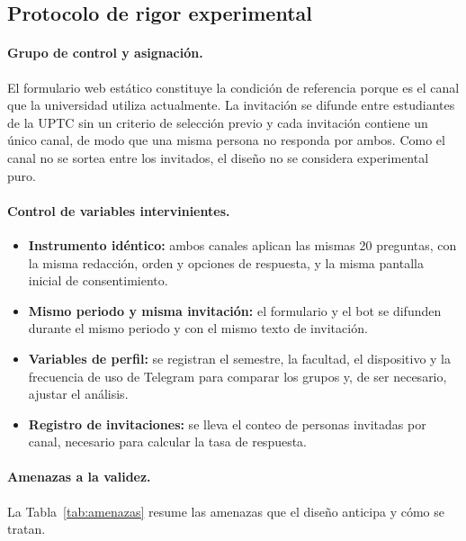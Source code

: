 \documentclass[12pt,letterpaper]{article}
\begin{document}
\subsection{Protocolo de rigor experimental}

\paragraph{Grupo de control y asignación.} El formulario web estático constituye la condición de referencia porque es el canal que la universidad utiliza actualmente. La invitación se difunde entre estudiantes de la UPTC sin un criterio de selección previo y cada invitación contiene un único canal, de modo que una misma persona no responda por ambos. Como el canal no se sortea entre los invitados, el diseño no se considera experimental puro.

\paragraph{Control de variables intervinientes.}

\begin{itemize}
    \item \textbf{Instrumento idéntico:} ambos canales aplican las mismas 20 preguntas, con la misma redacción, orden y opciones de respuesta, y la misma pantalla inicial de consentimiento.
    \item \textbf{Mismo periodo y misma invitación:} el formulario y el bot se difunden durante el mismo periodo y con el mismo texto de invitación.
    \item \textbf{Variables de perfil:} se registran el semestre, la facultad, el dispositivo y la frecuencia de uso de Telegram para comparar los grupos y, de ser necesario, ajustar el análisis.
    \item \textbf{Registro de invitaciones:} se lleva el conteo de personas invitadas por canal, necesario para calcular la tasa de respuesta.
\end{itemize}

\paragraph{Amenazas a la validez.} La Tabla~\ref{tab:amenazas} resume las amenazas que el diseño anticipa y cómo se tratan.
\end{document}

